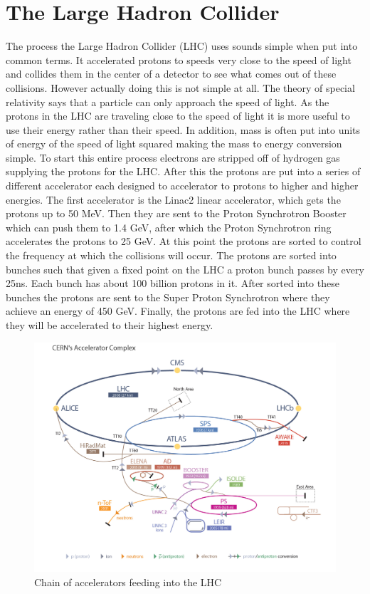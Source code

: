 
\section{The Large Hadron Collider}

The process the Large Hadron Collider (LHC) uses sounds simple when put into common terms. It accelerated protons to speeds very close to the speed of light and collides them in the center of a detector to see what comes out of these collisions. However actually doing this is not simple at all. The theory of special relativity says that a particle can only approach the speed of light. As the protons in the LHC are traveling close to the speed of light it is more useful to use their energy rather than their speed. In addition, mass is often put into units of energy of the speed of light squared making the mass to energy conversion simple. To start this entire process electrons are stripped off of hydrogen gas supplying the protons for the LHC. After this the protons are put into a series of different accelerator each designed to accelerator to protons to higher and higher energies. The first accelerator is the Linac2 linear accelerator, which gets the protons up to 50 MeV. Then they are sent to the Proton Synchrotron Booster which can push them to 1.4 GeV, after which the Proton Synchrotron ring accelerates the protons to 25 GeV. At this point the protons are sorted to control the frequency at which the collisions will occur. The protons are sorted into bunches such that given a fixed point on the LHC a proton bunch passes by every 25ns. Each bunch has about 100 billion protons in it. After sorted into these bunches the protons are sent to the Super Proton Synchrotron where they achieve an energy of 450 GeV. Finally, the protons are fed into the LHC where they will be accelerated to their highest energy.

\begin{figure}
\centering
\includegraphics[width=0.8\linewidth]{Figures/acceleratorcomplex.jpg}
\caption{Chain of accelerators feeding into the LHC}
\label{fig:acceleratorcomplex}
\end{figure}

